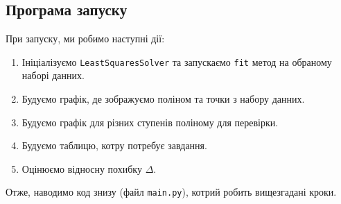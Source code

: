 \documentclass[12pt]{extarticle}
\begin{document}
\subsection{Програма запуску}

При запуску, ми робимо наступні дії:
\begin{enumerate}
    \item Ініціалізуємо \texttt{LeastSquaresSolver} та запускаємо \texttt{fit} метод на обраному наборі данних.
    \item Будуємо графік, де зображуємо поліном та точки з набору данних.
    \item Будуємо графік для різних ступенів поліному для перевірки.
    \item Будуємо таблицю, котру потребує завдання.
    \item Оцінюємо відносну похибку $\Delta$.
\end{enumerate}

Отже, наводимо код знизу (файл \texttt{main.py}), котрий робить вищезгадані кроки.
\end{document}
